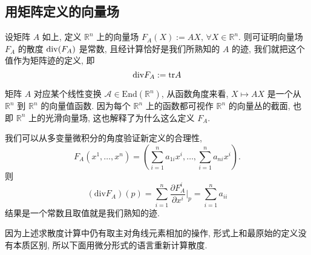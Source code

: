 \subsection{用矩阵定义的向量场}
    设矩阵  $A$ 如上, 定义 $\mathbb{R}^n$ 上的向量场 $F_A(X) := AX,\,\forall X\in\mathbb{R}^n$.
    则可证明向量场 $F_A$ 的散度 ${\rm div}(F_A)$ 是常数, 且经计算恰好是我们所熟知的 $A$ 的迹, 我们就把这个值作为矩阵迹的定义, 即
    \begin{equation*}
        {\rm div}F_A := {\rm tr}A
    \end{equation*}
    \begin{remark}
        矩阵 $A$ 对应某个线性变换 $\mathcal{A}\in\mathrm{End}(\mathbb{R}^n)$, 从函数角度来看,   $X\mapsto AX$ 是一个从 $\mathbb{R}^n$ 到 $\mathbb{R}^n$ 的向量值函数.
        因为每个 $\mathbb{R}^n$ 上的函数都可视作 $\mathbb{R}^n$ 的向量丛的截面, 也即 $\mathbb{R}^n$ 上的光滑向量场, 这也解释了为什么这么定义 $F_A$.
    \end{remark}
    \begin{remark}
        我们可以从多变量微积分的角度验证新定义的合理性,
        \begin{equation*}
            F_A(x^1,\dots,x^n) = (\sum_{i=1}^{n}a_{1i}x^i,\dots,\sum_{i=1}^{n}a_{ni}x^i).
        \end{equation*}
        则
        \begin{equation*}
            (\mathrm{div} F_A)(p) = \sum_{i=1}^{n}\frac{\partial F_A^i}{\partial x^i}\Bigg|_p = \sum_{i=1}^{n}a_{ii}
        \end{equation*}
        结果是一个常数且取值就是我们熟知的迹.
    \end{remark}
    因为上述求散度计算中仍有取主对角线元素相加的操作, 形式上和最原始的定义没有本质区别, 所以下面用微分形式的语言重新计算散度.

